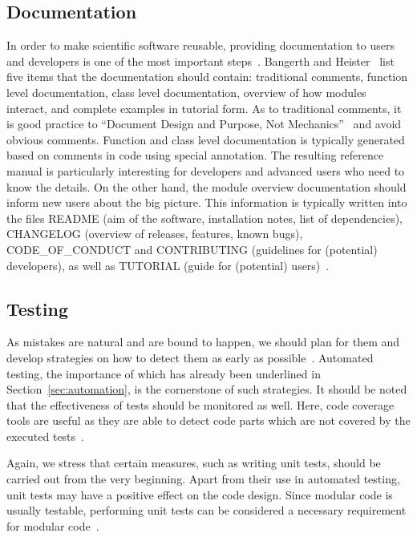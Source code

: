\documentclass[@CLASSOPTIONS@]{tumarticle}
\begin{document}
\subsection{Documentation}
\label{sec:documentation}

In order to make scientific software reusable, providing documentation to
users and developers is one of the most important
steps~\cite{nowogrodzki2019, hunt1999pragmatic, prlic2012, bangerth2013, %
  wilson2014, wilson2017, schlauch2018dlrguide, netherlands-guide2019}.
Bangerth and Heister~\cite{bangerth2013} list five items that the
documentation should contain: traditional comments, function level
documentation, class level documentation, overview of how modules interact,
and complete examples in tutorial form. As to traditional comments, it is
good practice to
``Document Design and Purpose, Not Mechanics''~\cite{wilson2014} and avoid
obvious comments. Function and class level documentation is typically
generated based on comments in code using special annotation. The resulting
reference manual is particularly interesting for developers and advanced
users who need to know the details. On the other hand, the module overview
documentation should inform new users about the big picture. This information
is typically written into the files README (aim of the software, installation
notes, list of dependencies), CHANGELOG (overview of releases, features,
known bugs), CODE\_OF\_CONDUCT and CONTRIBUTING (guidelines for (potential)
developers), as well as TUTORIAL (guide for (potential)
users)~\cite{wilson2017}.

\subsection{Testing}

As mistakes are natural and are bound to happen, we should plan for them and
develop strategies on how to detect them as early as
possible~\cite{wilson2014}. Automated testing, the importance of which has
already been underlined in Section~\ref{sec:automation}, is the cornerstone
of such strategies. It should be noted that the effectiveness of tests should
be monitored as well. Here, code coverage tools are useful as they are able
to detect code parts which are not covered by the executed
tests~\cite{schlauch2018dlrguide}.

Again, we stress that certain measures, such as writing unit tests, should be
carried out from the very beginning. Apart from their use in automated
testing, unit tests may have a positive effect on the code design. Since
modular code is usually testable, performing unit tests can be considered a
necessary requirement for modular code~\cite{hunt1999pragmatic}.
\end{document}

